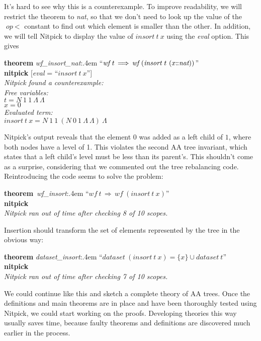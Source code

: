 \documentclass[a4paper,12pt]{article}
\def\Colon{\mathord{:\mkern-1.5mu:}}
\begin{document}
It's hard to see why this is a counterexample. To improve readability, we will
restrict the theorem to \textit{nat}, so that we don't need to look up the value
of the $\textit{op}~{<}$ constant to find out which element is smaller than the
other. In addition, we will tell Nitpick to display the value of
$\textit{insort}~t~x$ using the \textit{eval} option. This gives

\prew
\textbf{theorem} \textit{wf\_insort\_nat\/}:\kern.4em ``$\textit{wf}~t\,\Longrightarrow\, \textit{wf}~(\textit{insort}~t~(x\Colon\textit{nat}))$'' \\
\textbf{nitpick} [\textit{eval} = ``$\textit{insort}~t~x$''] \\[2\smallskipamount]
\slshape Nitpick found a counterexample: \\[2\smallskipamount]
\hbox{}\qquad Free variables: \nopagebreak \\
\hbox{}\qquad\qquad $t = N~1~1~\Lambda~\Lambda$ \\
\hbox{}\qquad\qquad $x = 0$ \\
\hbox{}\qquad Evaluated term: \\
\hbox{}\qquad\qquad $\textit{insort}~t~x = N~1~1~(N~0~1~\Lambda~\Lambda)~\Lambda$
\postw

Nitpick's output reveals that the element $0$ was added as a left child of $1$,
where both nodes have a level of 1. This violates the second AA tree invariant,
which states that a left child's level must be less than its parent's. This
shouldn't come as a surprise, considering that we commented out the tree
rebalancing code. Reintroducing the code seems to solve the problem:

\prew
\textbf{theorem}~\textit{wf\_insort\/}:\kern.4em ``$\textit{wf}~t\,\Longrightarrow\, \textit{wf}~(\textit{insort}~t~x)$'' \\
\textbf{nitpick} \\[2\smallskipamount]
{\slshape Nitpick ran out of time after checking 8 of 10 scopes.}
\postw

Insertion should transform the set of elements represented by the tree in the
obvious way:

\prew
\textbf{theorem} \textit{dataset\_insort\/}:\kern.4em
``$\textit{dataset}~(\textit{insort}~t~x) = \{x\} \cup \textit{dataset}~t$'' \\
\textbf{nitpick} \\[2\smallskipamount]
{\slshape Nitpick ran out of time after checking 7 of 10 scopes.}
\postw

We could continue like this and sketch a complete theory of AA trees. Once the
definitions and main theorems are in place and have been thoroughly tested using
Nitpick, we could start working on the proofs. Developing theories this way
usually saves time, because faulty theorems and definitions are discovered much
earlier in the process.
\end{document}
